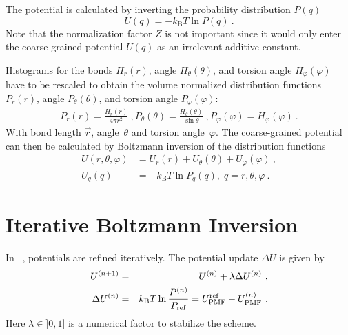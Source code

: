 The potential is calculated by inverting the probability distribution $P(q)$ 
\begin{equation}
  U(q) = - k_\text{B} T \ln  P(q) ~.
  \label{eq:inv_boltzmann}
\end{equation}
%
Note that the normalization factor $Z$ is not important since it would only enter the coarse-grained potential $U(q)$ as an irrelevant additive constant.

Histograms for the bonds $H_r(r)$, angle $H_\theta(\theta)$, and torsion angle $H_\varphi(\varphi)$ have to be rescaled to obtain the volume normalized distribution functions $P_r(r)$, angle $P_\theta(\theta)$, and torsion angle $P_\varphi(\varphi)$: 
%
\begin{align}
    P_r(r) = \frac{H_r(r)}{4\pi r^2}~,
    P_\theta(\theta) = \frac{H_\theta(\theta)}{\sin \theta}~,
    P_\varphi(\varphi) = H_\varphi (\varphi)~.
    \label{eq:boltzmann_norm}
\end{align}
With bond length $\vec{r}$, angle~$\theta$ and torsion angle~$\varphi$.%
The coarse-grained potential can then be calculated by Boltzmann inversion of the distribution functions
%
\begin{align}
    \label{eq:boltzmann_pmf}
    U({r}, \theta, \varphi) &= U_r({r}) + U_{\theta}(\theta) + U_{\varphi}(\varphi)~, \\
    U_q({q}) &= - k_\text{B} T \ln P_q( q ),\; q=r, \theta, \varphi~.
    \nonumber
\end{align}

\section{Iterative Boltzmann Inversion}
In \ibi~\cite{Reith:2003}, potentials are refined iteratively. The potential update $\Delta U$ is given by
\begin{eqnarray}
  \label{eq:iter_boltzmann}
  U^{(n+1)} &=& U^{(n)} + \lambda \Delta U^{(n)}~, \\
  \Delta U^{(n)} &=&  k_\text{B} T \ln  \frac{P^{(n)}}{P_{\rm ref}}
  =  U_\text{PMF}^\text{ref} - U_\text{PMF}^{(n)}~.
\end{eqnarray}
Here $\lambda \in ]0,1]$ is a numerical factor to stabilize the scheme.

